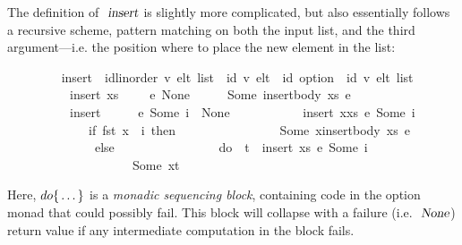 \documentclass[acmlarge,review,anonymous]{acmart}\settopmatter{printfolios=true}
\begin{document}
The definition of $\isa{insert}$ is slightly more complicated, but also essentially follows a recursive scheme, pattern matching on both the input list, and the third argument---i.e. the position where to place the new element in the list:
\\
\begin{isabellebody}
\ \ \ \ \ \ \ \  insert\ {\isacharcolon}{\isacharcolon}\ {\isachardoublequoteopen}{\isacharparenleft}{\isacharprime}id{\isacharcolon}{\isacharcolon}{\isacharbraceleft}linorder{\isacharbraceright}{\isacharcomma}\ {\isacharprime}v{\isacharparenright}\ elt\ list\ {\isasymRightarrow}\ {\isacharparenleft}{\isacharprime}id{\isacharcomma}\ {\isacharprime}v{\isacharparenright}\ elt\ {\isasymRightarrow}\ {\isacharprime}id\ option\ {\isasymrightharpoonup}\ {\isacharparenleft}{\isacharprime}id{\isacharcomma}\ {\isacharprime}v{\isacharparenright}\ elt\ list{\isachardoublequoteclose}\ \isanewline
\ \ \ \ \ \ \ \ \ \ {\isachardoublequoteopen}insert\ xs\ \ \ \ \ e\ None\ \ \ \ \ {\isacharequal}\ Some\ {\isacharparenleft}insert{\isacharunderscore}body\ xs\ e{\isacharparenright}{\isachardoublequoteclose}\ {\isacharbar}\isanewline
\ \ \ \ \ \ \ \ \ \ {\isachardoublequoteopen}insert\ {\isacharbrackleft}{\isacharbrackright}\ \ \ \ \ e\ {\isacharparenleft}Some\ i{\isacharparenright}\ {\isacharequal}\ None{\isachardoublequoteclose}\ {\isacharbar}\isanewline
\ \ \ \ \ \ \ \ \ \ {\isachardoublequoteopen}insert\ {\isacharparenleft}x{\isacharhash}xs{\isacharparenright}\ e\ {\isacharparenleft}Some\ i{\isacharparenright}\ {\isacharequal}\isanewline
\ \ \ \ \ \ \ \ \ \ \ \ \ {\isacharparenleft}if\ fst\ x\ {\isacharequal}\ i\ then\isanewline
\ \ \ \ \ \ \ \ \ \ \ \ \ \ \ \ Some\ {\isacharparenleft}x{\isacharhash}insert{\isacharunderscore}body\ xs\ e{\isacharparenright}\isanewline
\ \ \ \ \ \ \ \ \ \ \ \ \ \ else\isanewline
\ \ \ \ \ \ \ \ \ \ \ \ \ \ \ \ do\ {\isacharbraceleft}\ t\ {\isasymleftarrow}\ insert\ xs\ e\ {\isacharparenleft}Some\ i{\isacharparenright}\isanewline
\ \ \ \ \ \ \ \ \ \ \ \ \ \ \ \ \ \ \ {\isacharsemicolon}\ Some\ {\isacharparenleft}x{\isacharhash}t{\isacharparenright}\isanewline
\ \ \ \ \ \ \ \ \ \ \ \ \ \ \ \ \ \ \ {\isacharbraceright}{\isacharparenright}{\isachardoublequoteclose}
\end{isabellebody}
\vspace{\baselineskip}
Here, $do {\emph{$\{$}} \ldots {\emph{$\}$}}$ is a \emph{monadic sequencing block}, containing code in the option monad that could possibly fail.
This block will collapse with a failure (i.e. $\isa{None}$) return value if any intermediate computation in the block fails.
\end{document}
